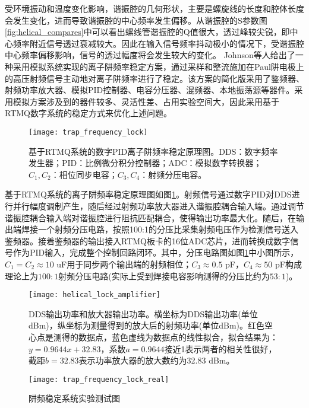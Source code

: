 受环境振动和温度变化影响，谐振腔的几何形状，主要是螺旋线的长度和腔体长度会发生变化，进而导致谐振腔的中心频率发生偏移。从谐振腔的S参数图\ref{fig:helical_compares}中可以看出螺线管谐振腔的Q值很大，透过峰较尖锐，即中心频率附近信号透过衰减较大。因此在输入信号频率抖动极小的情况下，受谐振腔中心频率偏移影响，信号的透过幅度将会发生较大的变化。
Johnson等人\cite[]{Johnson_Wong_Campos_Restelli_Landsman_Neyenhuis_Mizrahi_Monroe_2016}给出了一种采用模拟系统实现的离子阱频率稳定方案，通过采样和整流施加在Paul阱电极上的高压射频信号主动地对离子阱频率进行了稳定。该方案的简化版采用了鉴频器、射频功率放大器、模拟PID控制器、电容分压器、混频器、本地振荡源等器件。采用模拟方案涉及到的器件较多、灵活性差、占用实验空间大，因此采用基于RTMQ数字系统的稳定方式来优化上述问题。

\begin{figure}
    \centering
    \texttt{[image: trap\_frequency\_lock]}
    \caption[基于RTMQ系统的数字PID离子阱频率稳定原理图]{基于RTMQ系统的数字PID离子阱频率稳定原理图。DDS：数字频率发生器；PID：比例微分积分控制器；ADC：模拟数字转换器；$C_1,C_2$：相位同步电容；$C_3,C_4$：射频分压电容。\label{fig:trap_frequency_lock}}
\end{figure}


基于RTMQ系统的离子阱频率稳定原理图如图\ref{fig:trap_frequency_lock}。射频信号通过数字PID对DDS进行并行幅度调制产生，随后经过射频功率放大器进入谐振腔耦合输入端。通过调节谐振腔耦合输入端对谐振腔进行阻抗匹配耦合，使得输出功率最大化。随后，在输出端焊接一个射频分压电路，按照100:1的分压比采集射频电压作为检测信号送入鉴频器。接着鉴频器的输出接入RTMQ板卡的16位ADC芯片，进而转换成数字信号作为PID输入，完成整个控制回路闭环。其中，分压电路图如图\ref{fig:trap_frequency_lock}中小图所示，$C_1=C_2\approx10$ uF用于同步两个输出端的射频相位；$C_3\approx0.5$ pF，$C_4\approx50$ pF构成理论上为$100:1$射频分压电路(实际上受到焊接电容影响测得的分压比约为$53:1$)。

\begin{figure}
    \centering
    \texttt{[image: helical\_lock\_amplifier]}
    \caption[DDS输出功率和放大器输出功率]{DDS输出功率和放大器输出功率。横坐标为DDS输出功率(单位dBm)，纵坐标为测量得到的放大后的射频功率(单位dBm)。红色空心点是测得的数据点，蓝色虚线为数据点的线性拟合，拟合结果为：$y=0.9644x+32.83$，系数$a=0.9644$接近1表示两者的相关性很好，截距$b=32.83$表示功率放大器的放大数约为32.83 dBm。\label{fig:helical_lock_amplifier}}
\end{figure}


\begin{figure}
    \centering
    \texttt{[image: trap\_frequency\_lock\_real]}
    \caption[阱频稳定系统实验测试图]{阱频稳定系统实验测试图\label{fig:trap_frequency_lock_real}}
\end{figure}


